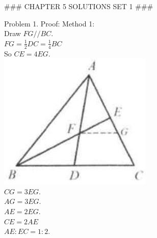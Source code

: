 \documentclass[10pt]{article}
\begin{document}
### CHAPTER 5 SOLUTIONS SET 1 ###

Problem 1. Proof:
Method 1:\\
Draw \(F G / / B C\).\\
\(F G=\frac{1}{2} D C=\frac{1}{4} B C\)\\
So \(C E=4 E G\).\\
\includegraphics[max width=\textwidth, center]{2025_04_17_97bc1f7e44d93c271a88g-131(3)}\\
\(C G=3 E G\).\\
\(A G=3 E G\).\\
\(A E=2 E G\).\\
\(C E=2 A E\)\\
\(A E: E C=1: 2\).
\end{document}
